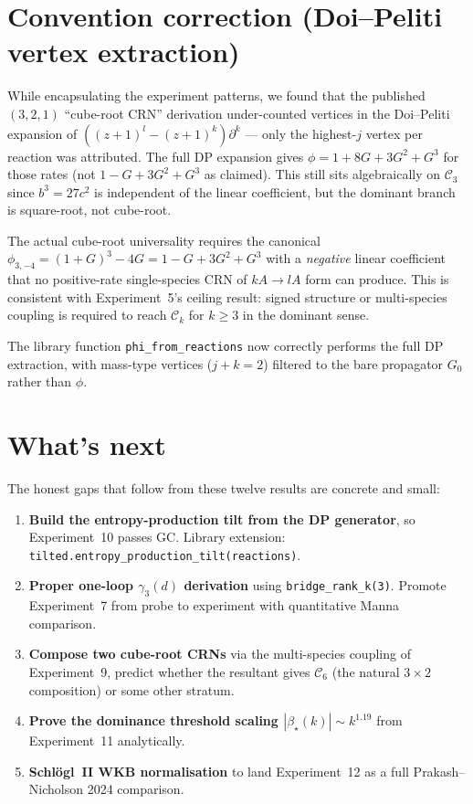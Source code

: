 \documentclass[11pt,a4paper]{article}
\theoremstyle{plain}
\newcommand{\Ck}{\mathcal{C}}
\begin{document}
\section{Convention correction (Doi--Peliti vertex extraction)}
\label{sec:correction}

While encapsulating the experiment patterns, we found that the published
$(3,2,1)$ ``cube-root CRN'' derivation under-counted vertices in the
Doi--Peliti expansion of $((z+1)^{l}-(z+1)^{k})\partial^{k}$ --- only the
highest-$j$ vertex per reaction was attributed.  The full DP expansion
gives $\phi = 1 + 8G + 3G^{2} + G^{3}$ for those rates (not $1 - G + 3G^{2}
+ G^{3}$ as claimed).  This still sits algebraically on $\Ck_{3}$ since
$b^{3}=27c^{2}$ is independent of the linear coefficient, but the dominant
branch is square-root, not cube-root.

The actual cube-root universality requires the canonical
$\phi_{3,-4} = (1+G)^{3} - 4G = 1 - G + 3G^{2} + G^{3}$ with a
\emph{negative} linear coefficient that no positive-rate single-species CRN
of $kA \to lA$ form can produce.  This is consistent with Experiment~5's
ceiling result: signed structure or multi-species coupling is required
to reach $\Ck_{k}$ for $k\geq 3$ in the dominant sense.

The library function \texttt{phi\_from\_reactions} now correctly performs
the full DP extraction, with mass-type vertices ($j+k=2$) filtered to the
bare propagator $G_{0}$ rather than $\phi$.

\section{What's next}
\label{sec:next}

The honest gaps that follow from these twelve results are concrete and
small:

\begin{enumerate}[leftmargin=1.2em]
\item \textbf{Build the entropy-production tilt from the DP generator},
  so Experiment~10 passes GC.  Library extension:
  \texttt{tilted.entropy\_production\_tilt(reactions)}.
\item \textbf{Proper one-loop $\gamma_{3}(d)$ derivation} using
  \texttt{bridge\_rank\_k(3)}.  Promote Experiment~7 from probe to
  experiment with quantitative Manna comparison.
\item \textbf{Compose two cube-root CRNs} via the multi-species coupling
  of Experiment~9, predict whether the resultant gives $\Ck_{6}$ (the
  natural $3\times 2$ composition) or some other stratum.
\item \textbf{Prove the dominance threshold scaling
  $|\beta_{\star}(k)| \sim k^{1.19}$} from Experiment~11 analytically.
\item \textbf{Schl\"ogl~II WKB normalisation} to land Experiment~12 as a
  full Prakash--Nicholson 2024 comparison.
\end{enumerate}
\end{document}
